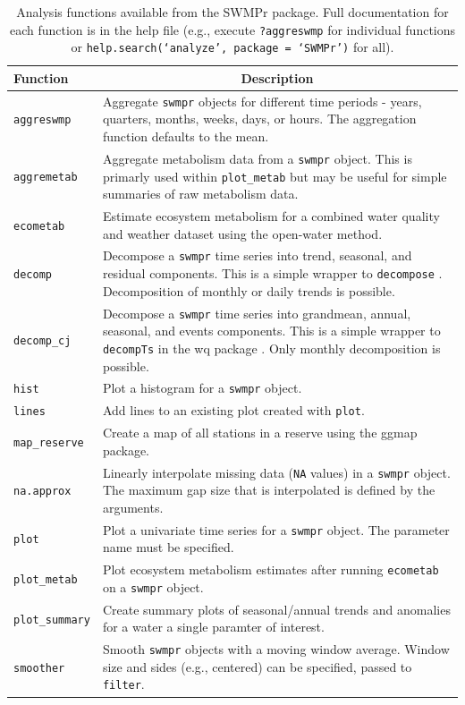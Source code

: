 \documentclass[10pt,letterpaper]{article}\usepackage[]{graphicx}\usepackage[]{color}
\begin{document}
\begin{table}[!tbp]
\caption{Analysis functions available from the SWMPr package.  Full documentation for each function is in the help file (e.g., execute \texttt{?aggreswmp} for individual functions or \texttt{help.search(`analyze', package = `SWMPr')} for all).\label{tab:analyze}} 
\begin{center}
\begin{tabular}{lp{3.5in}}
\hline\hline
\multicolumn{1}{l}{Function}&\multicolumn{1}{c}{Description}\tabularnewline
\hline
\texttt{aggreswmp}&Aggregate \texttt{swmpr} objects for different time periods - years, quarters, months,  weeks, days, or hours.  The aggregation function defaults to the mean.\tabularnewline
\texttt{aggremetab}&Aggregate metabolism data from a \texttt{swmpr} object.  This is primarly used within \texttt{plot\_metab} but may be useful for simple summaries of raw metabolism data.\tabularnewline
\texttt{ecometab}&Estimate ecosystem metabolism for a combined water quality and weather dataset using the open-water method.\tabularnewline
\texttt{decomp}&Decompose a \texttt{swmpr} time series into trend, seasonal, and residual components.  This is a simple wrapper to \texttt{decompose} \cite{Kendall83}.  Decomposition of monthly or daily trends is possible.\tabularnewline
\texttt{decomp\_cj}&Decompose a \texttt{swmpr} time series into grandmean, annual, seasonal, and events components.  This is a simple wrapper to \texttt{decompTs} in the wq package \cite{Jassby14}.  Only monthly decomposition is possible.\tabularnewline
\texttt{hist}&Plot a histogram for a \texttt{swmpr} object.\tabularnewline
\texttt{lines}&Add lines to an existing plot created with \texttt{plot}.\tabularnewline
\texttt{map\_reserve}&Create a map of all stations in a reserve using the ggmap package.\tabularnewline
\texttt{na.approx}&Linearly interpolate missing data (\texttt{NA} values) in a \texttt{swmpr} object. The maximum gap size that is interpolated is defined by the arguments.\tabularnewline
\texttt{plot}&Plot a univariate  time series for a \texttt{swmpr} object.  The parameter name must be specified.\tabularnewline
\texttt{plot\_metab}&Plot ecosystem metabolism estimates after running \texttt{ecometab} on a \texttt{swmpr} object.\tabularnewline
\texttt{plot\_summary}&Create summary plots of seasonal/annual trends and anomalies for a water a single paramter of interest.\tabularnewline
\texttt{smoother}&Smooth \texttt{swmpr} objects with a moving window average.  Window size and sides (e.g., centered) can be specified, passed to \texttt{filter}.\tabularnewline
\hline
\end{tabular}\end{center}


\end{table}
\end{document}

